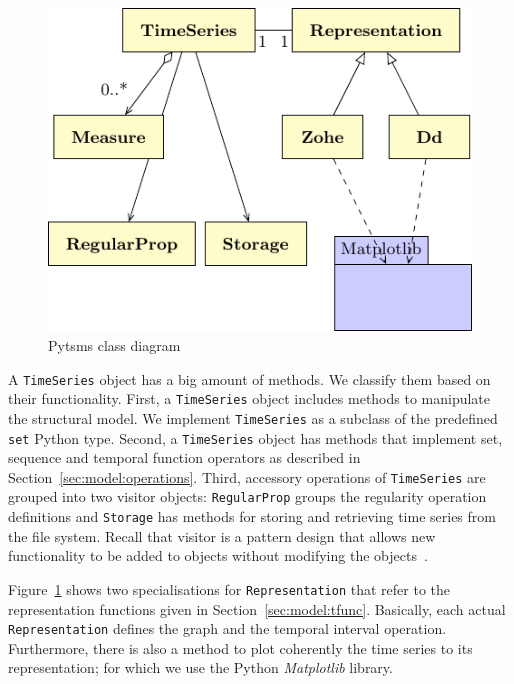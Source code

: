 \begin{figure}[tp]
  \centering
  \includegraphics{fig_pytsms_uml.pdf}
  \caption{Pytsms  class diagram}
  \label{fig:implementacio:pytsms-uml}
\end{figure}


A \texttt{TimeSeries} object has a big amount of methods. We classify
them based on their functionality. First, a \texttt{TimeSeries} object
includes methods to manipulate the structural model. We implement
\texttt{TimeSeries} as a subclass of the predefined \texttt{set}
Python type. Second, a \texttt{TimeSeries} object has methods that
implement set, sequence and temporal function operators as described
in Section~\ref{sec:model:operations}.  Third, accessory operations of
\texttt{TimeSeries} are grouped into two visitor objects:
\texttt{RegularProp} groups the regularity operation definitions and
\texttt{Storage} has methods for storing and retrieving time series
from the file system. Recall that visitor is a pattern design that
allows new functionality to be added to objects without modifying the
objects~\cite{ziade08:expert_python_programming:visitor,martin02:visitor}.

Figure~\ref{fig:implementacio:pytsms-uml} shows two specialisations
for \texttt{Representation} that refer to the representation functions
given in Section~\ref{sec:model:tfunc}. Basically, each actual
\texttt{Representation} defines the graph and the temporal interval
operation. Furthermore, there is also a method to plot coherently the
time series to its representation; for which we use the Python
\emph{Matplotlib} library.
%



